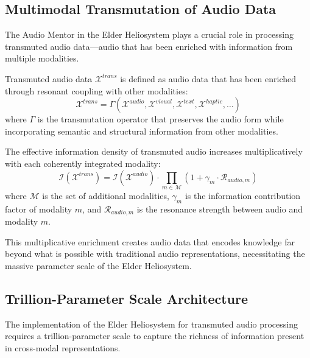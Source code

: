 \subsection{Multimodal Transmutation of Audio Data}

The Audio Mentor in the Elder Heliosystem plays a crucial role in processing transmuted audio data—audio that has been enriched with information from multiple modalities.

\begin{definition}
Transmuted audio data $\mathcal{X}^{trans}$ is defined as audio data that has been enriched through resonant coupling with other modalities:
\begin{equation}
\mathcal{X}^{trans} = \Gamma\left(\mathcal{X}^{audio}, \mathcal{X}^{visual}, \mathcal{X}^{text}, \mathcal{X}^{haptic}, \ldots\right)
\end{equation}
where $\Gamma$ is the transmutation operator that preserves the audio form while incorporating semantic and structural information from other modalities.
\end{definition}

\begin{theorem}
The effective information density of transmuted audio increases multiplicatively with each coherently integrated modality:
\begin{equation}
\mathcal{I}(\mathcal{X}^{trans}) = \mathcal{I}(\mathcal{X}^{audio}) \cdot \prod_{m \in \mathcal{M}} \left(1 + \gamma_m \cdot \mathcal{R}_{audio,m}\right)
\end{equation}
where $\mathcal{M}$ is the set of additional modalities, $\gamma_m$ is the information contribution factor of modality $m$, and $\mathcal{R}_{audio,m}$ is the resonance strength between audio and modality $m$.
\end{theorem}

This multiplicative enrichment creates audio data that encodes knowledge far beyond what is possible with traditional audio representations, necessitating the massive parameter scale of the Elder Heliosystem.

\subsection{Trillion-Parameter Scale Architecture}

The implementation of the Elder Heliosystem for transmuted audio processing requires a trillion-parameter scale to capture the richness of information present in cross-modal representations.

